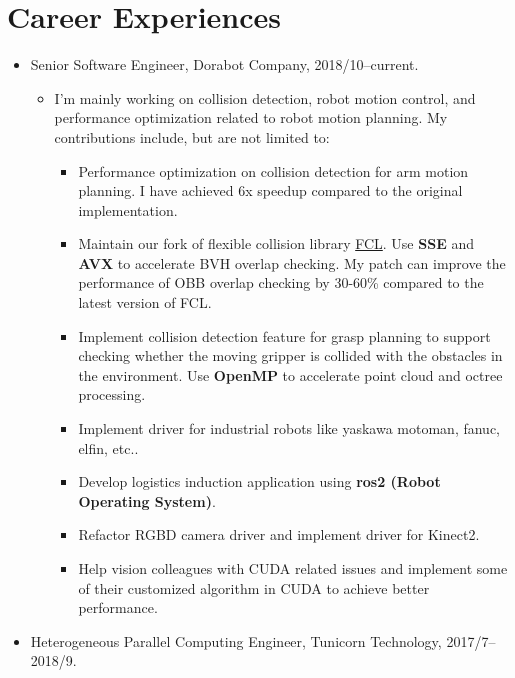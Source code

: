 \documentclass[letterpaper]{article}
\begin{document}
\section*{Career Experiences}
\begin{itemize}
    \item Senior Software Engineer, Dorabot Company, 2018/10--current.
        \begin{itemize}
            \item I'm mainly working on collision detection, robot motion control, and performance optimization related to robot motion planning. My contributions include, but are not limited to:
                \begin{itemize}
                    \item Performance optimization on collision detection for arm motion planning. I have achieved 6x speedup compared to the original implementation.
                    \item Maintain our fork of flexible collision library \href{https://github.com/flexible-collision-library/fcl}{FCL}. Use \textbf{SSE} and \textbf{AVX} to accelerate BVH overlap checking. My patch can improve the performance of OBB overlap checking by 30-60\% compared to the latest version of FCL.
                    \item Implement collision detection feature for grasp planning to support checking whether the moving gripper is collided with the obstacles in the environment. Use \textbf{OpenMP} to accelerate point cloud and octree processing.
                    \item Implement driver for industrial robots like yaskawa motoman, fanuc, elfin, etc..
                    \item Develop logistics induction application using \textbf{ros2 (Robot Operating System)}.
                    \item Refactor RGBD camera driver and implement driver for Kinect2.
                    \item Help vision colleagues with CUDA related issues and implement some of their customized algorithm in CUDA to achieve better performance.
                \end{itemize}
        \end{itemize}
    \item Heterogeneous Parallel Computing Engineer, Tunicorn Technology, 2017/7--2018/9.

\end{itemize}
\end{document}
